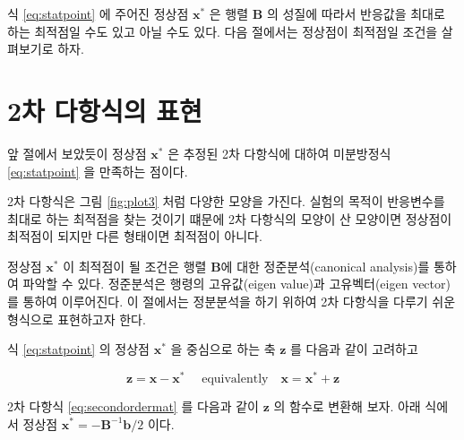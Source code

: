 \documentclass[
]{book}
\newcommand{\bm}[1]{\boldsymbol{\mathbf{#1}}}
\theoremstyle{definition}
\theoremstyle{definition}
\theoremstyle{definition}
\theoremstyle{definition}
\theoremstyle{remark}
\begin{document}
식 \eqref{eq:statpoint} 에 주어진 정상점 \({\bm x}^*\) 은 행렬 \(\bm B\) 의 성질에 따라서 반응값을 최대로 하는 최적점일 수도 있고 아닐 수도 있다.
다음 절에서는 정상점이 최적점일 조건을 살펴보기로 하자.

\hypertarget{uxcc28-uxb2e4uxd56duxc2dduxc758-uxd45cuxd604}{%
\section{2차 다항식의 표현}\label{uxcc28-uxb2e4uxd56duxc2dduxc758-uxd45cuxd604}}

앞 절에서 보았듯이 정상점 \({\bm x}^*\) 은 추정된 2차 다항식에 대하여 미분방정식 \eqref{eq:statpoint} 을 만족하는 점이다.

2차 다항식은 그림 \ref{fig:plot3} 처럼 다양한 모양을 가진다. 실험의 목적이 반응변수를 최대로 하는 최적점을 찾는
것이기 떄문에 2차 다항식의 모양이 산 모양이면 정상점이 최적점이 되지만 다른 형태이면 최적점이 아니다.

정상점 \({\bm x}^*\) 이 최적점이 될 조건은 행렬 \(\bm B\)에 대한 정준분석(canonical analysis)를 통하여 파악할 수 있다. 정준분석은 행령의 고유값(eigen value)과 고유벡터(eigen vector) 를 통하여 이루어진다. 이 절에서는 정분분석을 하기 위하여 2차 다항식을 다루기 쉬운 형식으로 표현하고자 한다.

식 \eqref{eq:statpoint} 의 정상점 \({\bm x}^*\) 을 중심으로 하는 축 \(\bm z\) 를 다음과 같이 고려하고

\begin{equation}
\bm z = \bm x - {\bm x}^* \quad \text{ equivalently} \quad  \bm x =  {\bm x}^* + \bm z 
\label{eq:transz}
\end{equation}

2차 다항식 \eqref{eq:secondordermat} 를 다음과 같이 \(\bm z\) 의 함수로 변환해 보자. 아래 식에서 정상점 \({\bm x}^* = -{\bm B}^{-1} \bm b/2\) 이다.
\end{document}
